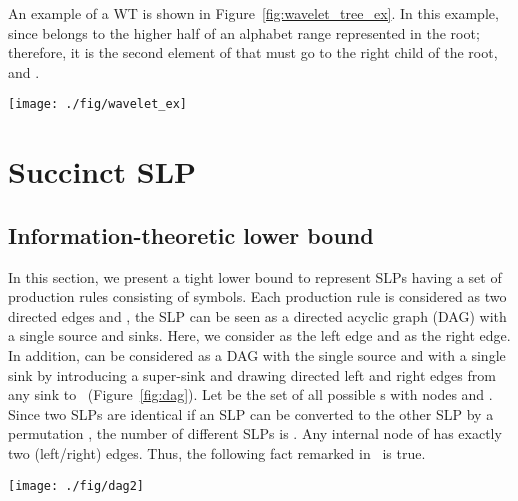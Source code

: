 \documentclass[10pt]{llncs}
\begin{document}
An example of a WT is shown in Figure~\ref{fig:wavelet_tree_ex}.
In this example, since  belongs to the higher half  of an alphabet range  represented in the root; therefore, it is the second element of  that must go to the right child of the root,  and .

\begin{figure*}[t]
\begin{center}
\texttt{[image: ./fig/wavelet\_ex]}
\end{center}
\vspace{-0.5cm}
\caption{Example of wavelet tree for a sequence  over an alphabet .}
\label{fig:wavelet_tree_ex}
\end{figure*}





\section{Succinct SLP}

\subsection{Information-theoretic lower bound}
In this section, we present a tight lower bound to represent SLPs
having a set of production rules  consisting of  symbols.
Each production rule  is considered as two directed edges  and , 
the SLP can be seen as a directed acyclic graph (DAG) with a single source and  sinks.
Here, we consider  as the left edge and  as the right edge.
In addition,  can be considered as a DAG with the single source and 
with a single sink 
by introducing a super-sink  and drawing directed left and right edges from any sink to ~(Figure~\ref{fig:dag}). 
Let  be the set of all possible s with  nodes and 
. 
Since two SLPs are identical if an SLP can be converted to the other SLP by 
a permutation ,
the number of different SLPs is .
Any internal node of  has exactly two (left/right) edges.
Thus, the following fact remarked in~\cite{Maruyama2011} is true.

\begin{figure*}[t]
\begin{center}
\texttt{[image: ./fig/dag2]}
\end{center}
\vspace{-0.7cm}
\caption{Example of DAG representation of an SLP and its spanning tree decomposition. 
An SLP is represented by a DAG .  is decomposed into the left tree  and right tree .}
\label{fig:dag}
\end{figure*}
\end{document}
